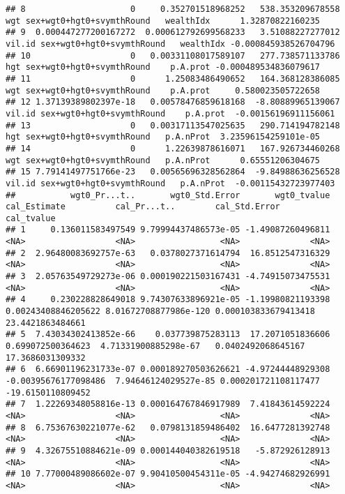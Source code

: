 \documentclass[
]{book}
\begin{document}
\begin{verbatim}
## 8                     0     0.352701518968252   538.353209678558        wgt sex+wgt0+hgt0+svymthRound   wealthIdx      1.32870822160235
## 9  0.000447277200167272  0.000612792699568233   3.51088227277012     vil.id sex+wgt0+hgt0+svymthRound   wealthIdx -0.000845938526704796
## 10                    0   0.00331108017589107   277.738571133786        hgt sex+wgt0+hgt0+svymthRound    p.A.prot -0.000489534836079617
## 11                    0      1.25083486490652   164.368128386085        wgt sex+wgt0+hgt0+svymthRound    p.A.prot     0.580023505722658
## 12 1.37139389802397e-18   0.00578476859618168  -8.80889965139067     vil.id sex+wgt0+hgt0+svymthRound    p.A.prot  -0.00156196911156061
## 13                    0   0.00317113547025635   290.714194782148        hgt sex+wgt0+hgt0+svymthRound   p.A.nProt  3.23596154259101e-05
## 14                    0      1.22639878616071   167.926734460268        wgt sex+wgt0+hgt0+svymthRound   p.A.nProt      0.65551206304675
## 15 7.79141497751766e-23   0.00565696328562864  -9.84988636256528     vil.id sex+wgt0+hgt0+svymthRound   p.A.nProt  -0.00115432723977403
##           wgt0_Pr...t..       wgt0_Std.Error       wgt0_tvalue         cal_Estimate          cal_Pr...t..        cal_Std.Error        cal_tvalue
## 1     0.136011583497549 9.79994437486573e-05 -1.49087260496811                 <NA>                  <NA>                 <NA>              <NA>
## 2  2.96480083692757e-63   0.0378027371614794  16.8512547316329                 <NA>                  <NA>                 <NA>              <NA>
## 3  2.05763549729273e-06 0.000190221503167431 -4.74915073475531                 <NA>                  <NA>                 <NA>              <NA>
## 4     0.230228828649018 9.74307633896921e-05 -1.19980821193398  0.00243408846205622 8.01672708877986e-120 0.000103833679413418  23.4421863484661
## 5  7.43034302413852e-66    0.037739875283113  17.2071051836606    0.699072500364623  4.71331900885298e-67   0.0402492068645167  17.3686031309332
## 6  6.66901196231733e-07 0.000189270503626621 -4.97244448929308 -0.00395676177098486  7.94646124029527e-85 0.000201721108117477 -19.6150110809452
## 7  1.22269348058816e-13 0.000164767846917989  7.41843614592224                 <NA>                  <NA>                 <NA>              <NA>
## 8  6.75367630221077e-62   0.0798131859486402  16.6477281392748                 <NA>                  <NA>                 <NA>              <NA>
## 9  4.32675510884621e-09 0.000144040382619518   -5.872926128913                 <NA>                  <NA>                 <NA>              <NA>
## 10 7.77000489086602e-07 9.90410500454311e-05 -4.94274682926991                 <NA>                  <NA>                 <NA>              <NA>

\end{verbatim}
\end{document}

